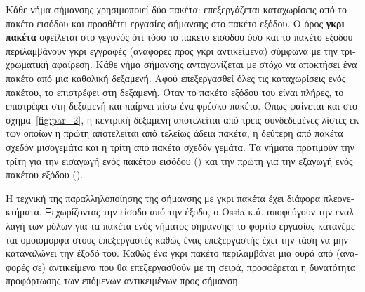 \begin{greek}
Κάθε νήμα σήμανσης χρησιμοποιεί δύο πακέτα: επεξεργάζεται
καταχωρίσεις από το πακέτο εισόδου και προσθέτει εργασίες 
σήμανσης στο πακέτο εξόδου. Ο όρος \textbf{γκρι πακέτα} οφείλεται 
στο γεγονός ότι τόσο το πακέτο εισόδου όσο και το πακέτο εξόδου
περιλαμβάνουν γκρι εγγραφές (αναφορές προς γκρι αντικείμενα)
σύμφωνα με την τριχρωματική αφαίρεση. Κάθε νήμα σήμανσης ανταγωνίζεται
με στόχο να αποκτήσει ένα πακέτο από μια καθολική δεξαμενή.
Αφού επεξεργασθεί όλες τις καταχωρίσεις ενός πακέτου, το επιστρέφει
στη δεξαμενή. Όταν το πακέτο εξόδου του είναι πλήρες, το επιστρέφει
στη δεξαμενή και παίρνει πίσω ένα φρέσκο πακέτο. Όπως φαίνεται
και στο σχήμα~\ref{fig:par_2}, η κεντρική δεξαμενή αποτελείται
από τρεις συνδεδεμένες λίστες εκ των οποίων η πρώτη αποτελείται
από τελείως άδεια πακέτα, η δεύτερη από πακέτα σχεδόν μισογεμάτα
και η τρίτη από πακέτα σχεδόν γεμάτα. Τα νήματα προτιμούν την
τρίτη για την εισαγωγή ενός πακέτου εισόδου (\textenglish{})
και την πρώτη για την εξαγωγή ενός πακέτου εξόδου (\textenglish{}).

Η τεχνική της παραλληλοποίησης της σήμανσης με γκρι πακέτα έχει
διάφορα πλεονεκτήματα. Ξεχωρίζοντας την είσοδο από την έξοδο,
ο Ossia κ.ά. αποφεύγουν την εναλλαγή των ρόλων για τα πακέτα
ενός νήματος σήμανσης: το φορτίο εργασίας κατανέμεται ομοιόμορφα
στους επεξεργαστές καθώς ένας επεξεργαστής έχει την τάση να μην
καταναλώνει την έξοδό του. Καθώς ένα γκρι πακέτο περιλαμβάνει
μια ουρά από (αναφορές σε) αντικείμενα που θα επεξεργασθούν με
τη σειρά, προσφέρεται η δυνατότητα προφόρτωσης των επόμενων
αντικειμένων προς σήμανση.


\end{greek}

